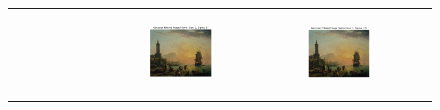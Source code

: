 \documentclass[hidelinks,12pt]{article}
\begin{document}
\begin{figure}[!h]
{\begin{tabular}{cccc}
\begin{subfigure}[h]{0.25\textwidth}
				\end{subfigure} &
				\begin{subfigure}[h]{0.25\textwidth}
					\centering
					\includegraphics[width=\textwidth]{figures/gaussian_filter/3.png}
				\end{subfigure} &
				\begin{subfigure}[h]{0.25\textwidth}
					\centering
					\includegraphics[width=\textwidth]{figures/gaussian_filter/4.png}
				\end{subfigure} \\
				

\end{tabular}}
\end{figure}
\end{document}

